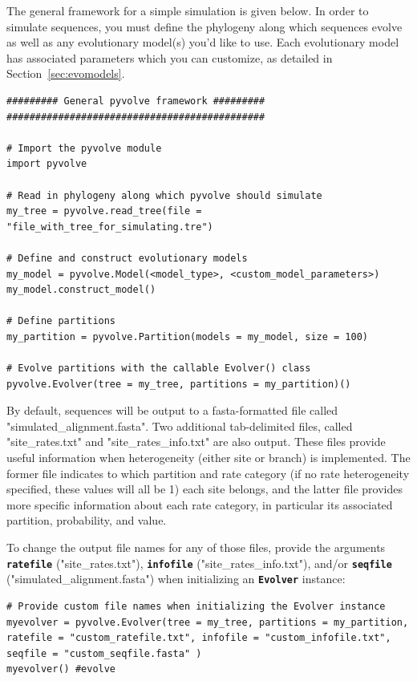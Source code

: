 \documentclass{article}
\newcommand{\code}[1]{\textbf{\texttt{\small{#1}}}}
\begin{document}
The general framework for a simple simulation is given below. In order to simulate sequences, you must define the phylogeny along which sequences evolve as well as any evolutionary model(s) you'd like to use. Each evolutionary model has associated parameters which you can customize, as detailed in Section~\ref{sec:evomodels}.

\begin{lstlisting}
######### General pyvolve framework #########
#############################################

# Import the pyvolve module
import pyvolve

# Read in phylogeny along which pyvolve should simulate
my_tree = pyvolve.read_tree(file = "file_with_tree_for_simulating.tre")

# Define and construct evolutionary models
my_model = pyvolve.Model(<model_type>, <custom_model_parameters>)
my_model.construct_model()

# Define partitions
my_partition = pyvolve.Partition(models = my_model, size = 100)

# Evolve partitions with the callable Evolver() class
pyvolve.Evolver(tree = my_tree, partitions = my_partition)()
\end{lstlisting}

By default, sequences will be output to a fasta-formatted file called "simulated\_alignment.fasta". Two additional tab-delimited files, called "site\_rates.txt" and "site\_rates\_info.txt" are also output. These files provide useful information when heterogeneity (either site or branch) is implemented. The former file indicates to which partition and rate category (if no rate heterogeneity specified, these values will all be 1) each site belongs, and the latter file provides more specific information about each rate category, in particular its associated partition, probability, and value.

To change the output file names for any of those files, provide the arguments \code{ratefile} ("site\_rates.txt"), \code{infofile} ("site\_rates\_info.txt"), and/or \code{seqfile} ("simulated\_alignment.fasta") when initializing an \code{Evolver} instance:
\begin{lstlisting}
# Provide custom file names when initializing the Evolver instance
myevolver = pyvolve.Evolver(tree = my_tree, partitions = my_partition, ratefile = "custom_ratefile.txt", infofile = "custom_infofile.txt", seqfile = "custom_seqfile.fasta" )
myevolver() #evolve
\end{lstlisting}
\end{document}
